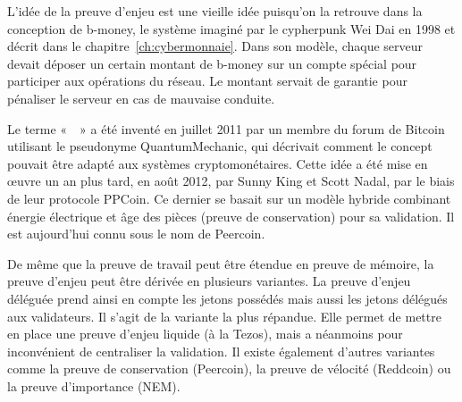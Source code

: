 
L'idée de la preuve d'enjeu est une vieille idée puisqu'on la retrouve dans la conception de b-money, le système imaginé par le cypherpunk Wei Dai en 1998 et décrit dans le chapitre~\ref{ch:cybermonnaie}. Dans son modèle, chaque serveur devait déposer un certain montant de b-money sur un compte spécial pour participer aux opérations du réseau. Le montant servait de garantie pour pénaliser le serveur en cas de mauvaise conduite.

Le terme «~~» a été inventé en juillet 2011 par un membre du forum de Bitcoin utilisant le pseudonyme QuantumMechanic, qui décrivait comment le concept pouvait être adapté aux systèmes cryptomonétaires. Cette idée a été mise en œuvre un an plus tard, en août 2012, par Sunny King et Scott Nadal, par le biais de leur protocole PPCoin. Ce dernier se basait sur un modèle hybride combinant énergie électrique et âge des pièces (preuve de conservation) pour sa validation. Il est aujourd'hui connu sous le nom de Peercoin.

De même que la preuve de travail peut être étendue en preuve de mémoire, la preuve d'enjeu peut être dérivée en plusieurs variantes. La preuve d'enjeu déléguée prend ainsi en compte les jetons possédés mais aussi les jetons délégués aux validateurs. Il s'agit de la variante la plus répandue. Elle permet de mettre en place une preuve d'enjeu liquide (à la Tezos), mais a néanmoins pour inconvénient de centraliser la validation. Il existe également d'autres variantes comme la preuve de conservation (Peercoin), la preuve de vélocité (Reddcoin) ou la preuve d'importance (NEM).

